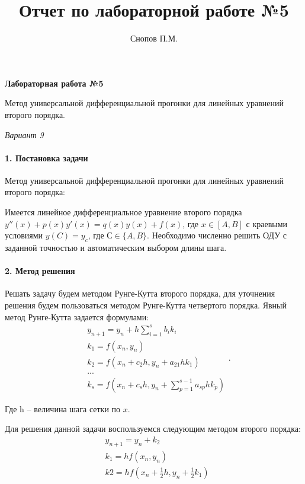 \documentclass[11pt,a4paper]{report}
\begin{document}
\lstset{
	language=Python,
	tabsize=2,
	showspaces=false,
	showstringspaces=false,
	float=[htb],
	captionpos=b,
	basicstyle=\footnotesize,
	numberblanklines=false,
}



\title{Отчет по лабораторной работе №5}

\author{Снопов П.М.}
\thispagestyle{titlepagestyle}
\maketitle
\begin{center}
	\textbf{Лабораторная работа №5}

	Метод универсальной дифференциальной прогонки для линейных уравнений второго порядка.

	\textit{Вариант 9}
\end{center}

\paragraph{1. Постановка задачи}
Метод универсальной дифференциальной прогонки для линейных уравнений второго порядка:

Имеется линейное дифференциальное уравнение второго порядка $ y''(x) + p(x)y'(x) = q(x)y(x) + f(x) $, где $ x \in [A, B] $ с краевыми условиями $ y(C) = y_c $, где $ С \in \{A,B\} $. Необходимо численно решить ОДУ с заданной точностью и автоматическим выбором длины шага.
\paragraph{2. Метод решения}
Решать задачу будем методом Рунге-Кутта второго порядка, для уточнения решения будем пользоваться методом Рунге-Кутта четвертого порядка. Явный метод Рунге-Кутта задается формулами:
\[
	\begin{aligned}
		 & y_{n+1} = y_n + h\sum_{i=1}^s b_ik_i                 \\
		 & k_1 = f(x_n, y_n)                                    \\
		 & k_2 = f(x_n + c_2h, y_n + a_{21}hk_1)                \\
		 & ...                                                  \\
		 & k_s = f(x_n + c_sh, y_n+\sum_{p=1}^{s-1} a_{sp}hk_p)
	\end{aligned}.
\]

Где h -- величина шага сетки по $ x $.

Для решения данной задачи воспользуемся следующим методом второго порядка:
\[
	\begin{aligned}
		 & y_{n+1} = y_n + k_2                               \\
		 & k_1 = hf(x_n,y_n)                                 \\
		 & k2 = hf(x_n + \frac{1}{2}h, y_n + \frac{1}{2}k_1)
	\end{aligned}
\]
\end{document}
